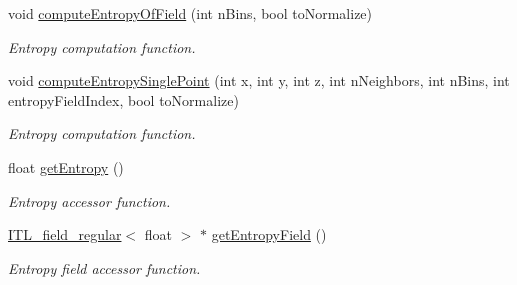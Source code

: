 \begin{DoxyCompactItemize}
void \hyperlink{classITL__localentropy_a3ecdb23e82f2585f7e616ddcfb76f285}{computeEntropyOfField} (int nBins, bool toNormalize)
\begin{DoxyCompactList}\small\item\em Entropy computation function. \item\end{DoxyCompactList}\item 
void \hyperlink{classITL__localentropy_a84ee26cee7651544ed49dfb4b465206d}{computeEntropySinglePoint} (int x, int y, int z, int nNeighbors, int nBins, int entropyFieldIndex, bool toNormalize)
\begin{DoxyCompactList}\small\item\em Entropy computation function. \item\end{DoxyCompactList}\item 
float \hyperlink{classITL__localentropy_a9605667a7f4428865d49c00237fffe53}{getEntropy} ()
\begin{DoxyCompactList}\small\item\em Entropy accessor function. \item\end{DoxyCompactList}\item 
\hyperlink{classITL__field__regular}{ITL\_\-field\_\-regular}$<$ float $>$ $\ast$ \hyperlink{classITL__localentropy_aaf4dbe3576fe662d3823d6e379618804}{getEntropyField} ()
\begin{DoxyCompactList}\small\item\em Entropy field accessor function. \item\end{DoxyCompactList}\end{DoxyCompactItemize}
